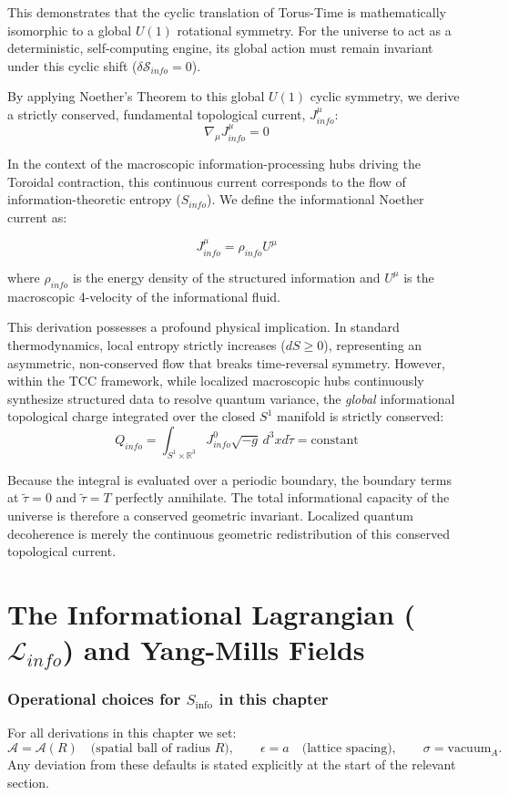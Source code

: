 \documentclass[12pt,openany]{book}
\theoremstyle{plain}
\theoremstyle{definition}
\theoremstyle{remark}
\begin{document}
This demonstrates that the cyclic translation of Torus-Time is mathematically isomorphic to a global $U(1)$ rotational symmetry. For the universe to act as a deterministic, self-computing engine, its global action must remain invariant under this cyclic shift ($\delta \mathcal{S}_{info} = 0$).

	By applying Noether's Theorem to this global $U(1)$ cyclic symmetry, we derive a strictly conserved, fundamental topological current, $J^\mu_{info}$:$$\nabla_\mu J^\mu_{info} = 0$$
	
	In the context of the macroscopic information-processing hubs driving the Toroidal contraction, this continuous current corresponds to the flow of information-theoretic entropy ($S_{info}$). We define the informational Noether current as:
	
	$$J^\mu_{info} = \rho_{info} U^\mu$$
	
	where $\rho_{info}$ is the energy density of the structured information and $U^\mu$ is the macroscopic 4-velocity of the informational fluid.
	
	This derivation possesses a profound physical implication. In standard thermodynamics, local entropy strictly increases ($dS \ge 0$), representing an asymmetric, non-conserved flow that breaks time-reversal symmetry. However, within the TCC framework, while localized macroscopic hubs continuously synthesize structured data to resolve quantum variance, the \textit{global} informational topological charge integrated over the closed $S^1$ manifold is strictly conserved:$$Q_{info} = \int_{S^1 \times \mathbb{R}^3} J^0_{info} \sqrt{-g} \, d^3x d\tilde{\tau} = \text{constant}$$
	
	Because the integral is evaluated over a periodic boundary, the boundary terms at $\tilde{\tau} = 0$ and $\tilde{\tau} = T$ perfectly annihilate. The total informational capacity of the universe is therefore a conserved geometric invariant. Localized quantum decoherence is merely the continuous geometric redistribution of this conserved topological current.

\chapter{The Informational Lagrangian ($\mathcal{L}_{info}$) and Yang-Mills Fields}

\subsection*{Operational choices for $S_{\mathrm{info}}$ in this chapter}
For all derivations in this chapter we set:
\[
\mathcal{A}=\mathcal{A}(R)\quad\text{(spatial ball of radius $R$)},\qquad
\epsilon=a\quad\text{(lattice spacing)},\qquad
\sigma=\text{vacuum}_A.
\]
Any deviation from these defaults is stated explicitly at the start of the relevant section.
\end{document}
